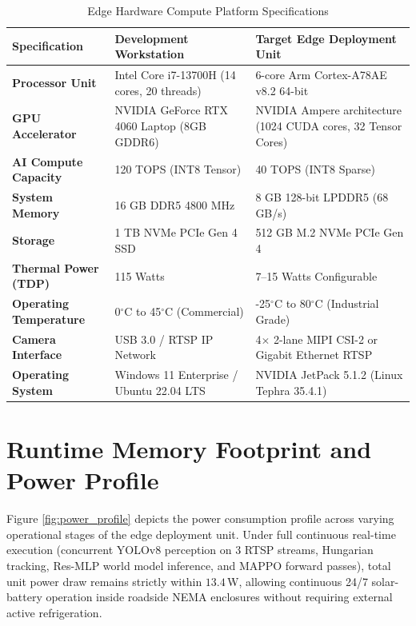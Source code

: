 \begin{table}[htbp]
\centering
\small
\caption{Edge Hardware Compute Platform Specifications}
\label{tab:edge_specs}
\begin{tabularx}{\textwidth}{|p{4.2cm}|p{5.5cm}|X|}
\hline
\textbf{Specification} & \textbf{Development Workstation} & \textbf{Target Edge Deployment Unit} \\ \hline
\textbf{Processor Unit} & Intel Core i7-13700H (14 cores, 20 threads) & 6-core Arm Cortex-A78AE v8.2 64-bit \\ \hline
\textbf{GPU Accelerator} & NVIDIA GeForce RTX 4060 Laptop (8GB GDDR6) & NVIDIA Ampere architecture (1024 CUDA cores, 32 Tensor Cores) \\ \hline
\textbf{AI Compute Capacity} & 120 TOPS (INT8 Tensor) & 40 TOPS (INT8 Sparse) \\ \hline
\textbf{System Memory} & 16 GB DDR5 4800 MHz & 8 GB 128-bit LPDDR5 (68 GB/s) \\ \hline
\textbf{Storage} & 1 TB NVMe PCIe Gen 4 SSD & 512 GB M.2 NVMe PCIe Gen 4 \\ \hline
\textbf{Thermal Power (TDP)} & 115 Watts & 7--15 Watts Configurable \\ \hline
\textbf{Operating Temperature} & 0$^\circ$C to 45$^\circ$C (Commercial) & -25$^\circ$C to 80$^\circ$C (Industrial Grade) \\ \hline
\textbf{Camera Interface} & USB 3.0 / RTSP IP Network & 4$\times$ 2-lane MIPI CSI-2 or Gigabit Ethernet RTSP \\ \hline
\textbf{Operating System} & Windows 11 Enterprise / Ubuntu 22.04 LTS & NVIDIA JetPack 5.1.2 (Linux Tephra 35.4.1) \\ \hline
\end{tabularx}
\end{table}

\section{Runtime Memory Footprint and Power Profile}
Figure \ref{fig:power_profile} depicts the power consumption profile across varying operational stages of the edge deployment unit. Under full continuous real-time execution (concurrent YOLOv8 perception on 3 RTSP streams, Hungarian tracking, Res-MLP world model inference, and MAPPO forward passes), total unit power draw remains strictly within $13.4$\,W, allowing continuous 24/7 solar-battery operation inside roadside NEMA enclosures without requiring external active refrigeration.

